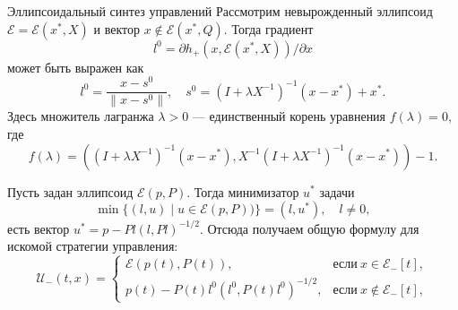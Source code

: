 \documentclass{beamer}
\begin{document}
\begin{frame}{Эллипсоидальный синтез управлений}
    \footnotesize
    Рассмотрим невырожденный эллипсоид \( \mathcal{E} = \mathcal{E}(x^*, X) \) и вектор \( x \notin 
     \mathcal{E}(x^*, Q). \) Тогда градиент
    \begin{equation*}
        l^0 = \partial h_+(x, \mathcal{E}(x^*, X)) / \partial x
    \end{equation*}
    может быть выражен как 
    \begin{equation*}
        l^0 = \frac{x - s^0}{\| x - s^0 \|}, \quad s^0 = (I + \lambda X^{-1})^{-1}(x - x^*) + x^*.
    \end{equation*}
    Здесь множитель лагранжа \( \lambda > 0 \) --- единственный корень уравнения \( f(\lambda) = 0 \),
    где
    \begin{equation*}
        f(\lambda) = ((I + \lambda X^{-1})^{-1}(x - x^*), X^{-1}(I + \lambda X^{-1})^{-1}(x - x^*)) - 1.
    \end{equation*}
    
    Пусть задан эллипсоид \( \mathcal{E}(p, P) \). Тогда минимизатор \( u^* \) задачи
    \begin{equation*}
        \min\{ (l, u) \mid u \in \mathcal{E}(p, P)) \} = (l, u^*), \quad l \ne 0, 
    \end{equation*}
    есть вектор \( u^* = p - Pl(l, Pl)^{-1/2} \).
    Отсюда получаем общую формулу для искомой стратегии управления:
    \begin{equation*}
    \mathcal{U}_-(t,x) = 
     \begin{cases}
        \mathcal{E}(p(t), P(t)), & \text{если} \ x \in \mathcal{E}_-[t], \\
        p(t) - P(t)l^0(l^0, P(t)l^0)^{-1/2}, & \text{если} \ x \notin \mathcal{E}_-[t],
     \end{cases}
    \end{equation*}

\end{frame}
\end{document}

